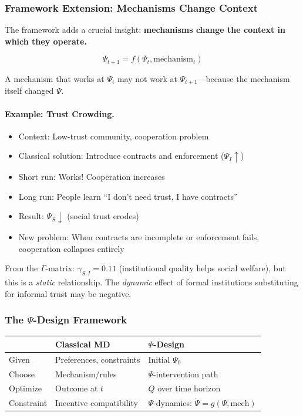 \subsubsection{Framework Extension: Mechanisms Change Context}

The framework adds a crucial insight: \textbf{mechanisms change the context 
in which they operate.}

\begin{equation}
\Psi_{t+1} = f(\Psi_t, \text{mechanism}_t)
\end{equation}

A mechanism that works at $\Psi_t$ may not work at $\Psi_{t+1}$---because 
the mechanism itself changed $\Psi$.

\paragraph{Example: Trust Crowding.}
\begin{itemize}
  \item Context: Low-trust community, cooperation problem
  \item Classical solution: Introduce contracts and enforcement ($\Psi_I \uparrow$)
  \item Short run: Works! Cooperation increases
  \item Long run: People learn ``I don't need trust, I have contracts''
  \item Result: $\Psi_S \downarrow$ (social trust erodes)
  \item New problem: When contracts are incomplete or enforcement fails, cooperation collapses entirely
\end{itemize}

From the $\Gamma$-matrix: $\gamma_{S,I} = 0.11$ (institutional quality helps social welfare), 
but this is a \emph{static} relationship. The \emph{dynamic} effect of formal 
institutions substituting for informal trust may be negative.

\subsubsection{The $\Psi$-Design Framework}

\begin{center}
\renewcommand{\arraystretch}{1.3}
\begin{tabular}{lll}
\hline
& \textbf{Classical MD} & \textbf{$\Psi$-Design} \\
\hline
Given & Preferences, constraints & Initial $\Psi_0$ \\
Choose & Mechanism/rules & $\Psi$-intervention path \\
Optimize & Outcome at $t$ & $Q$ over time horizon \\
Constraint & Incentive compatibility & $\Psi$-dynamics: $\dot{\Psi} = g(\Psi, \text{mech})$ \\
\hline
\end{tabular}
\end{center}

